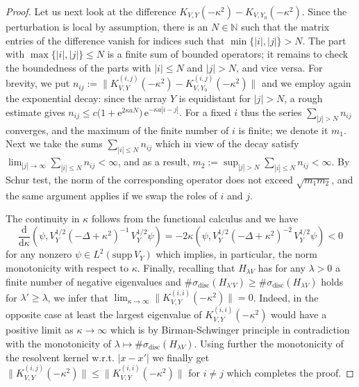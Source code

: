 \documentclass{article}
\numberwithin{equation}{section}
\theoremstyle{definition}
\newcommand{\D}{\mathrm{d}}
\newcommand{\e}{\mathrm{e}}
\newcommand{\N}{\mathbb{N}}
\begin{document}
\begin{proof}
Let us next look at the difference $K_{V,Y}(-\kappa^2)-K_{V,Y_0}(-\kappa^2)$. Since the perturbation is local by assumption, there is an $N\in\N$ such that the matrix entries of the difference vanish for indices such that $\min\{|i|,|j|\}>N$. The part with $\max\{|i|,|j|\}\le N$ is a finite sum of bounded operators; it remains to check the boundedness of the parts with $|i|\le N$ and $|j|> N$, and vice versa. For brevity, we put $n_{ij}:= \|K_{V,Y}^{(i,j)}(-\kappa^2) -K_{V,Y_0}^{(i,j)}(-\kappa^2)\|$ and we employ again the exponential decay: since the array $Y$ is equidistant for \mbox{$|j|>N$}, a rough estimate gives $n_{ij}\le c\big(1+\e^{2\kappa aN}\big)\,\e^{-\kappa a|i-j|}$. For a fixed $i$ thus the series $\sum_{|j|>N} n_{ij}$ converges, and the maximum of the finite number of $i$ is finite; we denote it $m_1$. Next we take the sums $\sum_{|i|\le N} n_{ij}$ which in view of the  decay satisfy $\lim_{|j|\to\infty}\sum_{|i|\le N} n_{ij}<\infty$, and as a result, $m_2:=\sup_{|j|>N} \sum_{|i|\le N} n_{ij} <\infty$. By Schur test, the norm of the corresponding operator does not exceed $\sqrt{m_1m_2}$, and the same argument applies if we swap the roles of $i$ and $j$.

The continuity in $\kappa$ follows from the functional calculus and  we have
\begin{equation*} %
\frac{\D}{\D\kappa} (\psi,V_Y^{1/2} (-\Delta+\kappa^2)^{-1}\, V_Y^{1/2}\psi) = -2\kappa (\psi,V_Y^{1/2} (-\Delta+\kappa^2)^{-2}\, V_Y^{1/2}\psi) < 0
\end{equation*} %
for any nonzero $\psi\in L^2(\mathrm{supp}\,V_Y)$ which implies, in particular, the norm monotonicity with respect to $\kappa$. Finally, recalling that $H_{\lambda V}$ has for any $\lambda>0$ a finite number of negative eigenvalues and $\#\sigma_\mathrm{disc}(H_{\lambda' V}) \ge \#\sigma_\mathrm{disc}(H_{\lambda V})$ holds for $\lambda'\ge\lambda$, we infer that $\lim_{\kappa\to\infty}\|K_{V,Y}^{(i,i)}(-\kappa^2)\|=0$. Indeed, in the opposite case at least the largest eigenvalue of $K_{V,Y}^{(i,i)}(-\kappa^2)$ would have a positive limit as $\kappa\to\infty$ which is by Birman-Schwinger principle in contradiction with the monotonicity of $\lambda\mapsto \#\sigma_\mathrm{disc}(H_{\lambda V})$. Using further the monotonicity of the resolvent kernel w.r.t. $|x-x'|$ we finally get $\|K_{V,Y}^{(i,j)}(-\kappa^2)\| \le \|K_{V,Y}^{(i,i)}(-\kappa^2)\|$ for $i\ne j$ which completes the proof.
\end{proof}
\end{document}

